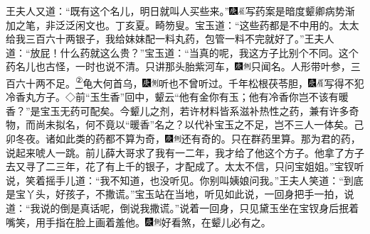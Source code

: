 王夫人又道：``既有这个名儿，明日就叫人买些来。''{\includegraphics[width=3mm]{../Images/00004}\includegraphics[width=3mm]{../Images/00010}\footnotesize \kaishu 写药案是暗度颦卿病势渐加之笔，非泛泛闲文也。丁亥夏。畸笏叟。}宝玉道：``这些药都是不中用的。太太给我三百六十两银子，我给妹妹配一料丸药，包管一料不完就好了。''王夫人道：``放屁！什么药就这么贵？''宝玉道：``当真的呢，我这方子比别个不同。这个药名儿也古怪，一时也说不清。只讲那头胎紫河车，{\includegraphics[width=3mm]{../Images/00004}\includegraphics[width=3mm]{../Images/00011}\footnotesize \kaishu 只闻名。}人形带叶参，三百六十两不足。\href{../Text/part0032_split_000.html\#lnkback_2_a}{\textsuperscript{②}}龟大何首乌，{\includegraphics[width=3mm]{../Images/00004}\includegraphics[width=3mm]{../Images/00011}\footnotesize \kaishu 听也不曾听过。}千年松根茯苓胆，{\includegraphics[width=3mm]{../Images/00004}\includegraphics[width=3mm]{../Images/00010}\footnotesize \kaishu 写得不犯冷香丸方子。◇前``玉生香''回中，颦云``他有金你有玉；他有冷香你岂不该有暖香？''是宝玉无药可配矣。今颦儿之剂，若许材料皆系滋补热性之药，兼有许多奇物，而尚未拟名，何不竟以``暖香''名之？以代补宝玉之不足，岂不三人一体矣。己卯冬夜。}诸如此类的药都不算为奇，{\includegraphics[width=3mm]{../Images/00004}\includegraphics[width=3mm]{../Images/00011}\footnotesize \kaishu 还有奇的。}只在群药里算。那为君的药，说起来唬人一跳。前儿薛大哥求了我有一二年，我才给了他这个方子。他拿了方子去又寻了二三年，花了有上千的银子，才配成了。太太不信，只问宝姐姐。''宝钗听说，笑着摇手儿道：``我不知道，也没听见。你别叫姨娘问我。''王夫人笑道：``到底是宝丫头，好孩子，不撒谎。''宝玉站在当地，听见如此说，一回身把手一拍，说道：``我说的倒是真话呢，倒说我撒谎。''说着一回身，只见黛玉坐在宝钗身后抿着嘴笑，用手指在脸上画着羞他。{\includegraphics[width=3mm]{../Images/00004}\includegraphics[width=3mm]{../Images/00011}\footnotesize \kaishu 好看煞，在颦儿必有之。}

